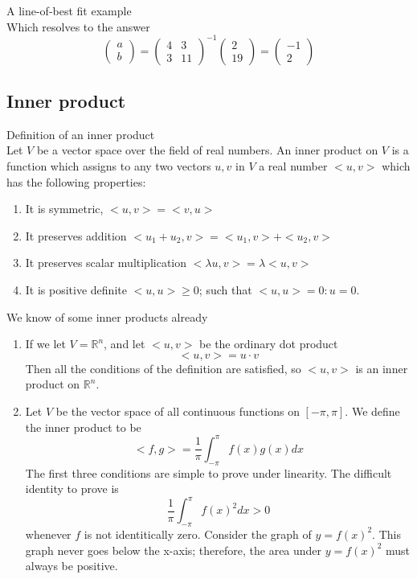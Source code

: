 \documentclass[journal, letterpaper]{IEEEtran}
\begin{document}
\begin{myboxg}{A line-of-best fit example}
$$    $$
    Which resolves to the answer
    $$
    \begin{pmatrix}
        a \\ b
    \end{pmatrix} = \begin{pmatrix}
        4 & 3 \\ 3 & 11
    \end{pmatrix}^{-1} \begin{pmatrix}
        2 \\ 19
    \end{pmatrix} = \begin{pmatrix}
        -1 \\ 2
    \end{pmatrix}
    $$
    \end{myboxg}
    \subsection{Inner product}
    \begin{mybox}{Definition of an inner product} \\ 
        Let $V$ be a vector space over the field of real numbers. An inner product on $V$ is a function which assigns to any two vectors $u, v$ in $V$ a real number $<u, v>$ which has the following properties:
        \begin{enumerate}
            \item It is symmetric, $<u, v> = <v, u>$
            \item It preserves addition $<u_1 + u_2, v> = <u_1, v> + <u_2, v>$
            \item It preserves scalar multiplication $<\lambda u, v> = \lambda <u, v>$
            \item It is positive definite $<u, u> \ge 0$; such that $<u, u> = 0 : u = 0$.
        \end{enumerate}
    \end{mybox}
    We know of some inner products already
    \begin{enumerate}
        \item If we let $V = \mathbb{R}^n$, and let $<u, v>$ be the ordinary dot product
        $$ <u, v> = u \cdot v $$
        Then all the conditions of the definition are satisfied, so $<u, v>$ is an inner product on $\mathbb{R}^n$.
        \item Let $V$ be the vector space of all continuous functions on $[-\pi, \pi]$. We define the inner product to be
        $$ <f, g> = \frac{1}{\pi} \int_{-\pi}^{\pi} f(x)g(x)dx$$
        The first three conditions are simple to prove under linearity. The difficult identity to prove is
        $$ \frac{1}{\pi}\int_{-\pi}^{\pi}f(x)^2dx > 0$$
        whenever $f$ is not identitically zero. Consider the graph of $y = f(x)^2$. This graph never goes below the x-axis; therefore, the area under $y = f(x)^2$ must always be positive.
    \end{enumerate}
\end{document}
